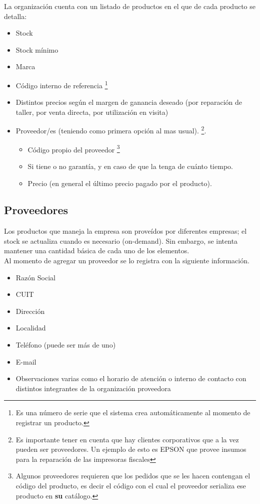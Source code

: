 \documentclass[12pt]{extarticle}
\begin{document}
\begin{spacing}{1.2}
    La organización cuenta con un listado de productos en el que de cada producto se detalla: 
    \begin{itemize}
    	\item Stock
    	\item Stock mínimo
        \item Marca
        \item Código interno de referencia \footnote{Es una número de serie que el sistema crea automáticamente al momento de registrar un producto.}
        \item Distintos precios según el margen de ganancia deseado (por reparación de taller, por venta directa, por utilización en visita)
        \item Proveedor/es (teniendo como primera opción al mas usual). \footnote{Es importante tener en cuenta que hay clientes corporativos que a la vez pueden ser proveedores. Un ejemplo de esto es EPSON que provee insumos para la reparación de las impresoras fiscales}. 
		\begin{itemize}
	        \item Código propio del proveedor \footnote{Algunos proveedores requieren que los pedidos que se les hacen contengan el código del producto, es decir el código con el cual el proveedor serializa ese producto en \textbf{su} catálogo.}
    	    \item Si tiene o no garantía, y en caso de que la tenga de cuánto tiempo.
    	    \item Precio (en general el último precio pagado por el producto).
		\end{itemize}
    \end{itemize}
    
    \subsection{Proveedores}

    Los productos que maneja la empresa son proveídos por diferentes empresas; el stock se actualiza cuando es necesario (on-demand). Sin embargo, se intenta mantener una cantidad básica de cada uno de los elementos.\\

    Al momento de agregar un proveedor se lo registra con la siguiente información.
        \begin{itemize}
            \item Razón Social
            \item CUIT
            \item Dirección
            \item Localidad
            \item Teléfono (puede ser más de uno)
            \item E-mail
            \item Observaciones varias como el horario de atención o interno de contacto con distintos integrantes de la organización proveedora
        \end{itemize}


\end{spacing}
\end{document}
